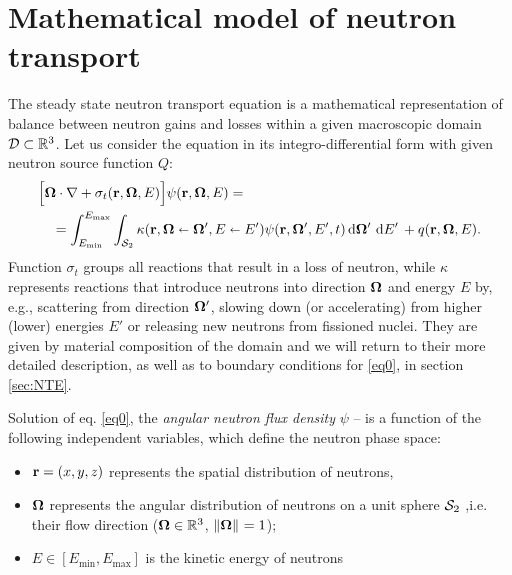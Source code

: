 \ifpdf
	\graphicspath{{2/pic/PNG/}{2/pic/PDF/}{2/pic/}}
\else
	\graphicspath{{2/pic/EPS/}{2/pic/}}
\fi

\chapter{Mathematical model of neutron transport}\label{chap:nte-review}


The steady state neutron transport equation is a mathematical representation of balance between neutron gains and losses
within a given macroscopic domain $\VV\subset\R[3]$\index{$\VV$}. Let us consider the equation in its
integro-differential form with given neutron source function $Q$:
\begin{equation}\label{eq0}
  \begin{multlined}
    \Bigl[
      \bomega\cdot\grad + \sigma_t(\br,\bomega,E)
    \Bigr]
    \psi(\br,\bomega,E) =\\
    = \intE[']{\Emin}{\Emax}{\intA[']{\kappa(\br,\bomega\sla\bomega',E\sla E')\psi(\br,\bomega',E',t)}}  + 
    \src(\br,\bomega,E).
  \end{multlined}  
\end{equation}
Function $\sigma_t$ groups all reactions that result in a loss of neutron, while
$\kappa$\index{$\kappa$} represents reactions that introduce neutrons into direction $\bomega$ and energy $E$ by, e.g.,
scattering from direction $\bomega'$, slowing down (or accelerating) from higher (lower) energies $E'$ or releasing new neutrons from fissioned nuclei.
They are given by material composition of the domain and we will return to their more detailed description, as
well as to boundary conditions for \eqref{eq0}, in section \ref{sec:NTE}.

Solution of eq. \eqref{eq0}, the \textit{angular neutron flux density} $\psi$ -- is a function of the following
independent variables, which define the neutron phase space:
\begin{itemize}
 	\item $\br = (x,y,z)$	\index{$\br$}
 	 represents the spatial distribution of
 	 neutrons,
 	\item $\bomega$\index{$\bomega$} represents the
 	angular distribution of neutrons on a unit sphere $\Sphere$ ,i.e. their flow direction ($\bomega\in\R[3]$, $\norm{\bomega}=1$);
 	\item $E\in [E_{\text{min}},E_{\text{max}}]$ is the
 	kinetic energy of neutrons
\end{itemize}

